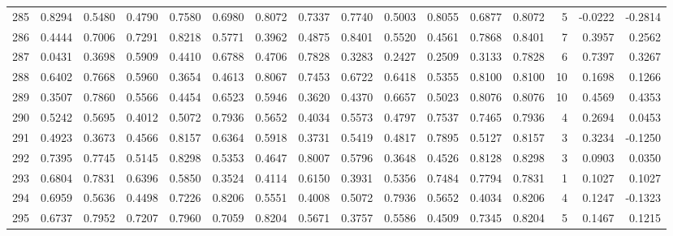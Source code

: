 \begin{tabular}{lrrrrrrrrrrrrrrr}
285 &      0.8294 &  0.5480 &  0.4790 &  0.7580 &  0.6980 &  0.8072 &  0.7337 &  0.7740 &  0.5003 &  0.8055 &   0.6877 &     0.8072 &      5 &                   -0.0222 &                    -0.2814 \\
286 &      0.4444 &  0.7006 &  0.7291 &  0.8218 &  0.5771 &  0.3962 &  0.4875 &  0.8401 &  0.5520 &  0.4561 &   0.7868 &     0.8401 &      7 &                    0.3957 &                     0.2562 \\
287 &      0.0431 &  0.3698 &  0.5909 &  0.4410 &  0.6788 &  0.4706 &  0.7828 &  0.3283 &  0.2427 &  0.2509 &   0.3133 &     0.7828 &      6 &                    0.7397 &                     0.3267 \\
288 &      0.6402 &  0.7668 &  0.5960 &  0.3654 &  0.4613 &  0.8067 &  0.7453 &  0.6722 &  0.6418 &  0.5355 &   0.8100 &     0.8100 &     10 &                    0.1698 &                     0.1266 \\
289 &      0.3507 &  0.7860 &  0.5566 &  0.4454 &  0.6523 &  0.5946 &  0.3620 &  0.4370 &  0.6657 &  0.5023 &   0.8076 &     0.8076 &     10 &                    0.4569 &                     0.4353 \\
290 &      0.5242 &  0.5695 &  0.4012 &  0.5072 &  0.7936 &  0.5652 &  0.4034 &  0.5573 &  0.4797 &  0.7537 &   0.7465 &     0.7936 &      4 &                    0.2694 &                     0.0453 \\
291 &      0.4923 &  0.3673 &  0.4566 &  0.8157 &  0.6364 &  0.5918 &  0.3731 &  0.5419 &  0.4817 &  0.7895 &   0.5127 &     0.8157 &      3 &                    0.3234 &                    -0.1250 \\
292 &      0.7395 &  0.7745 &  0.5145 &  0.8298 &  0.5353 &  0.4647 &  0.8007 &  0.5796 &  0.3648 &  0.4526 &   0.8128 &     0.8298 &      3 &                    0.0903 &                     0.0350 \\
293 &      0.6804 &  0.7831 &  0.6396 &  0.5850 &  0.3524 &  0.4114 &  0.6150 &  0.3931 &  0.5356 &  0.7484 &   0.7794 &     0.7831 &      1 &                    0.1027 &                     0.1027 \\
294 &      0.6959 &  0.5636 &  0.4498 &  0.7226 &  0.8206 &  0.5551 &  0.4008 &  0.5072 &  0.7936 &  0.5652 &   0.4034 &     0.8206 &      4 &                    0.1247 &                    -0.1323 \\
295 &      0.6737 &  0.7952 &  0.7207 &  0.7960 &  0.7059 &  0.8204 &  0.5671 &  0.3757 &  0.5586 &  0.4509 &   0.7345 &     0.8204 &      5 &                    0.1467 &                     0.1215 \\

\end{tabular}

